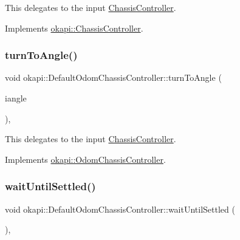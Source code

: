 This delegates to the input \mbox{\hyperlink{classokapi_1_1ChassisController}{Chassis\+Controller}}. 

Implements \mbox{\hyperlink{classokapi_1_1ChassisController_a35cadd99478629637b4bd3a5e709871a}{okapi\+::\+Chassis\+Controller}}.

\mbox{\label{classokapi_1_1DefaultOdomChassisController_aaf6e4d74384b87510d35b639e45f9dc2}} 
\subsubsection{\texorpdfstring{turnToAngle()}{turnToAngle()}}
{\footnotesize\ttfamily void okapi\+::\+Default\+Odom\+Chassis\+Controller\+::turn\+To\+Angle (\begin{DoxyParamCaption}\item[{const Q\+Angle \&}]{iangle }\end{DoxyParamCaption})\hspace{0.3cm}{\ttfamily [override]}, {\ttfamily [virtual]}}

This delegates to the input \mbox{\hyperlink{classokapi_1_1ChassisController}{Chassis\+Controller}}. 

Implements \mbox{\hyperlink{classokapi_1_1OdomChassisController_ac90298bb9081d95c52800dbf679dd658}{okapi\+::\+Odom\+Chassis\+Controller}}.

\mbox{\label{classokapi_1_1DefaultOdomChassisController_a44599379129060bdb44e6f603ee5777b}} 
\subsubsection{\texorpdfstring{waitUntilSettled()}{waitUntilSettled()}}
{\footnotesize\ttfamily void okapi\+::\+Default\+Odom\+Chassis\+Controller\+::wait\+Until\+Settled (\begin{DoxyParamCaption}{ }\end{DoxyParamCaption})\hspace{0.3cm}{\ttfamily [override]}, {\ttfamily [virtual]}}

